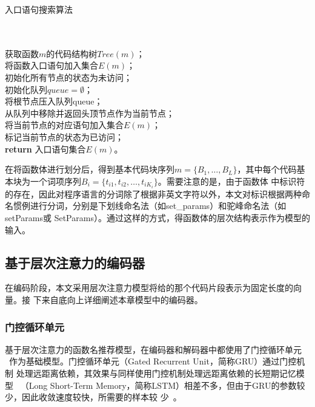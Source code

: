 \begin{algorithm}[H]
\caption{入口语句搜索算法}\label{alg:block}
\\
\\
获取函数$m$的代码结构树$Tree(m)$；\\
将函数入口语句加入集合$E(m)$；\\
初始化所有节点的状态为未访问；\\
初始化队列$queue=\emptyset$；\\
将根节点压入队列queue；\\
 {
    从队列中移除并返回头顶节点作为当前节点；\\
     {
         {
            将当前节点的对应语句加入集合$E(m)$；\\
        }
    }
    标记当前节点的状态为已访问；\\
}
\textbf{return} 入口语句集合$E(m)$。\\
\end{algorithm}

在将函数体进行划分后，得到基本代码块序列$m=\{B_1, \dots, B_L\}$，其中每个代码基
本块为一个词项序列$B_i=\{t_{i1},t_{i2},\dots,t_{iK_i}\}$。需要注意的是，由于函数体
中标识符的存在，因此对程序语言的分词除了根据非英文字符以外，本文对标识根据两种命
名惯例进行分词，分别是下划线命名法（如set\_params）和驼峰命名法（如setParams或
SetParams）。通过这样的方式，得函数体的层次结构表示作为模型的输入。


\subsection{基于层次注意力的编码器}
在编码阶段，本文采用层次注意力模型将给的那个代码片段表示为固定长度的向量。接
下来自底向上详细阐述本章模型中的编码器。

\subsubsection{门控循环单元}
基于层次注意力的函数名推荐模型，在编码器和解码器中都使用了门控循环单元
~\cite{Kyunghyun2014Learning}作为基础模型。门控循环单元（Gated Recurrent Unit，简称GRU）通过门控机制
处理远距离依赖，其效果与同样使用门控机制处理远距离依赖的长短期记忆模型~\cite{Hochreiter1997Long}
（Long Short-Term Memory，简称LSTM）相差不多，但由于GRU的参数较少，因此收敛速度较快，所需要的样本较
少~\cite{Chung2014Empirical}。

